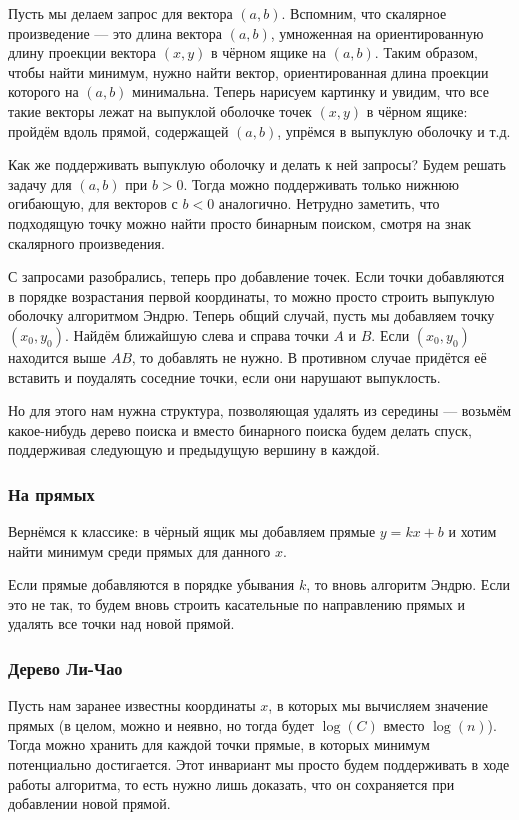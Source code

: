 Пусть мы делаем запрос для вектора $(a, b)$.
Вспомним, что скалярное произведение --- это длина вектора $(a, b)$, умноженная на ориентированную длину проекции вектора $(x, y)$ в чёрном ящике на $(a, b)$.
Таким образом, чтобы найти минимум, нужно найти вектор, ориентированная длина проекции которого на $(a, b)$ минимальна.
Теперь нарисуем картинку и увидим, что все такие векторы лежат на выпуклой оболочке точек $(x, y)$ в чёрном ящике: пройдём вдоль прямой, содержащей $(a, b)$, упрёмся в выпуклую оболочку и т.д.

Как же поддерживать выпуклую оболочку и делать к ней запросы?
Будем решать задачу для $(a, b)$ при $b > 0$.
Тогда можно поддерживать только нижнюю огибающую, для векторов с $b < 0$ аналогично.
Нетрудно заметить, что подходящую точку можно найти просто бинарным поиском, смотря на знак скалярного произведения.

С запросами разобрались, теперь про добавление точек.
Если точки добавляются в порядке возрастания первой координаты, то можно просто строить выпуклую оболочку алгоритмом Эндрю.
Теперь общий случай, пусть мы добавляем точку $(x_0, y_0)$.
Найдём ближайшую слева и справа точки $A$ и $B$.
Если $(x_0, y_0)$ находится выше $AB$, то добавлять не нужно.
В противном случае придётся её вставить и поудалять соседние точки, если они нарушают выпуклость.

Но для этого нам нужна структура, позволяющая удалять из середины --- возьмём какое-нибудь дерево поиска и вместо бинарного поиска будем делать спуск, поддерживая следующую и предыдущую вершину в каждой.

\subsubsection{На прямых}
Вернёмся к классике: в чёрный ящик мы добавляем прямые $y = kx + b$ и хотим найти минимум среди прямых для данного $x$.

Если прямые добавляются в порядке убывания $k$, то вновь алгоритм Эндрю.
Если это не так, то будем вновь строить касательные по направлению прямых и удалять все точки над новой прямой.

\subsubsection{Дерево Ли-Чао}
Пусть нам заранее известны координаты $x$, в которых мы вычисляем значение прямых (в целом, можно и неявно, но тогда будет $\log(C)$ вместо $\log(n)$).
Тогда можно хранить для каждой точки прямые, в которых минимум потенциально достигается.
Этот инвариант мы просто будем поддерживать в ходе работы алгоритма, то есть нужно лишь доказать, что он сохраняется при добавлении новой прямой.

